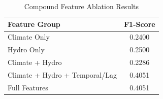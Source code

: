 \begin{table}[htbp]
\centering
\caption{Compound Feature Ablation Results}
\label{tab:ablation}
\begin{tabular}{@{}lc@{}}
\toprule
\textbf{Feature Group} & \textbf{F1-Score} \\
\midrule
Climate Only & 0.2400 \\
Hydro Only & 0.2500 \\
Climate + Hydro & 0.2286 \\
Climate + Hydro + Temporal/Lag & 0.4051 \\
Full Features & 0.4051 \\
\bottomrule
\end{tabular}
\end{table}